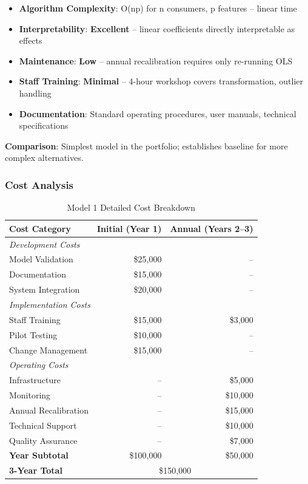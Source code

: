 \begin{itemize}
    \item \textbf{Algorithm Complexity}: O(np) for n consumers, p features -- linear time
    \item \textbf{Interpretability}: \textbf{Excellent} -- linear coefficients directly interpretable as effects
    \item \textbf{Maintenance}: \textbf{Low} -- annual recalibration requires only re-running OLS
    \item \textbf{Staff Training}: \textbf{Minimal} -- 4-hour workshop covers transformation, outlier handling
    \item \textbf{Documentation}: Standard operating procedures, user manuals, technical specifications
\end{itemize}

\textbf{Comparison}: Simplest model in the portfolio; establishes baseline for more complex alternatives.

\subsubsection{Cost Analysis}

\begin{table}[h]
\centering
\caption{Model 1 Detailed Cost Breakdown}
\begin{tabular}{lrr}
\toprule
\textbf{Cost Category} & \textbf{Initial (Year 1)} & \textbf{Annual (Years 2--3)} \\
\midrule
\multicolumn{3}{l}{\textit{Development Costs}} \\
Model Validation & \$25,000 & -- \\
Documentation & \$15,000 & -- \\
System Integration & \$20,000 & -- \\
\midrule
\multicolumn{3}{l}{\textit{Implementation Costs}} \\
Staff Training & \$15,000 & \$3,000 \\
Pilot Testing & \$10,000 & -- \\
Change Management & \$15,000 & -- \\
\midrule
\multicolumn{3}{l}{\textit{Operating Costs}} \\
Infrastructure & -- & \$5,000 \\
Monitoring & -- & \$10,000 \\
Annual Recalibration & -- & \$15,000 \\
Technical Support & -- & \$10,000 \\
Quality Assurance & -- & \$7,000 \\
\midrule
\textbf{Year Subtotal} & \$100,000 & \$50,000 \\
\textbf{3-Year Total} & \multicolumn{2}{c}{\$150,000} \\
\bottomrule
\end{tabular}
\end{table}

